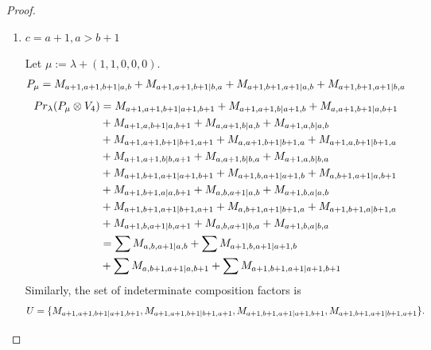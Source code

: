 \begin{proof}
\begin{enumerate}
\begin{enumerate}
        \item $c=a+1,a>b+1$ \par
        Let $\mu:=\lambda + (1,1,0,0,0) $.
        \begin{equation}\notag
          \begin{aligned}
            P_\mu = M_{a+1,a+1,b+1|a,b}
+ M_{a+1,a+1,b+1|b,a}
+ M_{a+1,b+1,a+1|a,b}
+ M_{a+1,b+1,a+1|b,a}
          \end{aligned}
        \end{equation}
        \begin{equation}\notag
          \begin{aligned}
            Pr_{\lambda}(P_\mu \otimes V_{4}) &=
M_{a+1,a+1,b+1|a+1,b+1}
+ M_{a+1,a+1,b|a+1,b}
+ M_{a,a+1,b+1|a,b+1}\\
                                              &
+ M_{a+1,a,b+1|a,b+1}
+ M_{a,a+1,b|a,b}
+ M_{a+1,a,b|a,b}\\
                                              &
+ M_{a+1,a+1,b+1|b+1,a+1}
+ M_{a,a+1,b+1|b+1,a}
+ M_{a+1,a,b+1|b+1,a}\\
                                              &
+ M_{a+1,a+1,b|b,a+1}
+ M_{a,a+1,b|b,a}
+ M_{a+1,a,b|b,a}\\
                                              &
+ M_{a+1,b+1,a+1|a+1,b+1}
+ M_{a+1,b,a+1|a+1,b}
+ M_{a,b+1,a+1|a,b+1}\\
                                              &
+ M_{a+1,b+1,a|a,b+1}
+ M_{a,b,a+1|a,b}
+ M_{a+1,b,a|a,b}\\
                                              &
+ M_{a+1,b+1,a+1|b+1,a+1}
+ M_{a,b+1,a+1|b+1,a}
+ M_{a+1,b+1,a|b+1,a}\\
                                              &
+ M_{a+1,b,a+1|b,a+1}
+ M_{a,b,a+1|b,a}
+ M_{a+1,b,a|b,a} \\
                                               &=
\sum M_{a,b,a+1|a,b}
+ \sum M_{a+1,b,a+1|a+1,b}\\
                                              &
+ \sum M_{a,b+1,a+1|a,b+1}
+ \sum M_{a+1,b+1,a+1|a+1,b+1}
          \end{aligned}
        \end{equation}
      Similarly, the set of indeterminate composition factors is 
\begin{equation}\notag
  \begin{aligned}
    U = \{
M_{a+1,a+1,b+1|a+1,b+1},
M_{a+1,a+1,b+1|b+1,a+1},
M_{a+1,b+1,a+1|a+1,b+1},
M_{a+1,b+1,a+1|b+1,a+1}
\}.
  \end{aligned}

\end{equation}
\end{enumerate}
\end{enumerate}
\end{proof}
